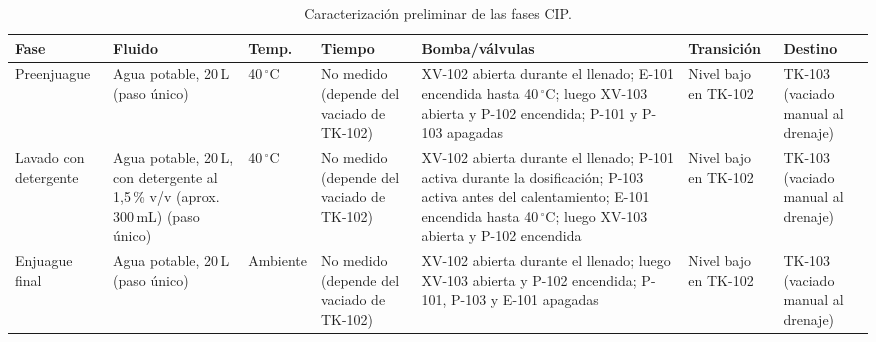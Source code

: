 \begin{table}[H]\centering\scriptsize\caption{Caracterización preliminar de las fases CIP.}\label{tab:fases_cip}
\begin{tabularx}{\textwidth}{L{1.9cm}L{2.3cm}L{1.4cm}L{2.0cm}YL{1.4cm}L{1.6cm}}\toprule
\textbf{Fase}&\textbf{Fluido}&\textbf{Temp.}&\textbf{Tiempo}&\textbf{Bomba/válvulas}&\textbf{Transición}&\textbf{Destino}\\\midrule
Preenjuague&Agua potable, 20\,L (paso único)&40\,$^{\circ}$C &No medido (depende del vaciado de TK-102)&XV-102 abierta durante el llenado; E-101 encendida hasta 40\,$^{\circ}$C; luego XV-103 abierta y P-102 encendida; P-101 y P-103 apagadas&Nivel bajo en TK-102&TK-103 (vaciado manual al drenaje)\\
Lavado con detergente&Agua potable, 20\,L, con detergente al 1,5\,\% v/v (aprox. 300\,mL) (paso único)&40\,$^{\circ}$C &No medido (depende del vaciado de TK-102)&XV-102 abierta durante el llenado; P-101 activa durante la dosificación; P-103 activa antes del calentamiento; E-101 encendida hasta 40\,$^{\circ}$C; luego XV-103 abierta y P-102 encendida&Nivel bajo en TK-102&TK-103 (vaciado manual al drenaje)\\
Enjuague final&Agua potable, 20\,L (paso único)&Ambiente&No medido (depende del vaciado de TK-102)&XV-102 abierta durante el llenado; luego XV-103 abierta y P-102 encendida; P-101, P-103 y E-101 apagadas&Nivel bajo en TK-102&TK-103 (vaciado manual al drenaje)\\\bottomrule
\end{tabularx}\end{table}
